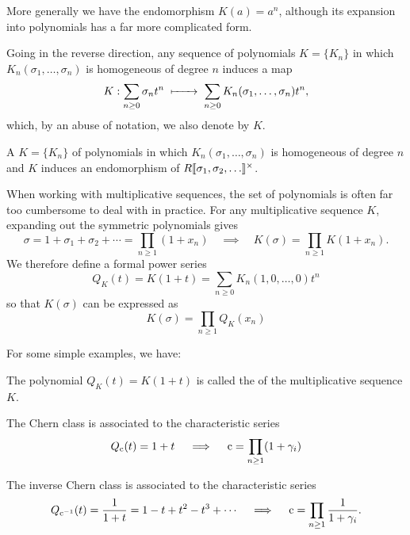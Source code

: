 \begin{example}
	More generally we have the endomorphism $K(a)=a^n$, although its expansion into polynomials has a far more complicated form.
\end{example}

Going in the reverse direction, any sequence of polynomials $K=\{K_n\}$ in which $K_n(\sigma_1,\ldots, \sigma_n)$ is homogeneous of degree $n$ induces a map
\begin{equation}\label{eq:multiplicative-sequence-endomorphism}
	K : \sum_{n\geq 0} \sigma_n t^n \lkxmapsto \sum_{n\geq 0} K_n(\sigma_1,\ldots, \sigma_n) t^n,
\end{equation}
which, by an abuse of notation, we also denote by $K$. 

\begin{definition}
	A  $K=\{K_n\}$ of polynomials in which $K_n(\sigma_1,\ldots, \sigma_n)$ is homogeneous of degree $n$ and $K$ induces an endomorphism of $R[\![\sigma_1,\sigma_2,\ldots]\!]^\times$.
\end{definition}


When working with multiplicative sequences, the set of polynomials is often far too cumbersome to deal with in practice. For any multiplicative sequence $K$,
expanding out the symmetric polynomials gives
\[
	\sigma = 1+\sigma_1+\sigma_2+\cdots = \prod_{n\geq 1}(1+x_n)
	\quad\implies\quad
	K(\sigma) = \prod_{n\geq 1} K(1+x_n).
\]
We therefore define a formal power series
\[
		Q_K(t) = K(1+t)=\sum_{n\geq 0}K_n(1,0,\ldots, 0) t^n
\]
so that $K(\sigma)$ can be expressed as
\[
		K(\sigma) = \prod_{n\geq 1}Q_K(x_n)
\]

For some simple examples, we have:

\begin{definition}
	The polynomial $Q_K(t)=K(1+t)$ is called the  of the multiplicative sequence $K$.
\end{definition}

\begin{example}
	The Chern class is associated to the characteristic series
	\[Q_{\mathrm{c}}(t)=1+t\quad\implies\quad \mathrm{c} = \prod_{n\geq 1} (1+\gamma_i)\]
\end{example}

\begin{example}
	The  inverse Chern class is associated to the characteristic series
	\[Q_{\mathrm{c}^{-1}}(t)=\frac{1}{1+t}=1-t+t^2-t^3+\cdots \quad\implies\quad \mathrm{c} = \prod_{n\geq 1} \frac{1}{1+\gamma_i}.\]
\end{example}

